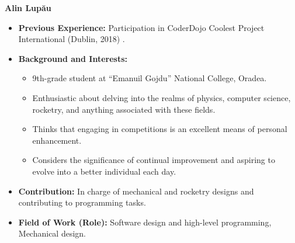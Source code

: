 \item[] \textbf{Alin Lup\u{a}u}
    \begin{itemize}[label=]
        \item[\faCogs] \textbf{Previous Experience:} Participation in CoderDojo Coolest Project International (Dublin, 2018)
.        %
        \item[\faGraduationCap] \textbf{Background and Interests:} 
        \begin{itemize}[label=\textbullet]
            \item 9th-grade student at “Emanuil Gojdu” National College, Oradea.
            \item Enthusiastic about delving into the realms of physics, computer science, rocketry, and anything associated with these fields.
            \item Thinks that engaging in competitions is an excellent means of personal enhancement.
            \item Considers the significance of continual improvement and aspiring to evolve into a better individual each day.
        \end{itemize}
        \item[\faEdit] \textbf{Contribution:} In charge of mechanical and rocketry designs and contributing to programming tasks. 
        \item[\faMicroscope] \textbf{Field of Work (Role):} Software design and high-level programming, Mechanical design.
    \end{itemize}
    \vspace{0.2 cm}
    